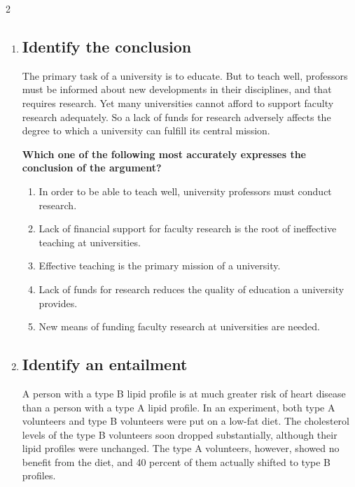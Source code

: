 \documentclass[9pt]{article}
\begin{document}
\begin{multicols}{2}
\small
\begin{enumerate}
\item
\subsection*{Identify the conclusion}

\noindent
The primary task of a university is to educate. But to teach well, professors must be informed about new developments in their disciplines, and that requires research. Yet many universities cannot afford to support faculty research adequately. So a lack of funds for research adversely affects the degree to which a university can fulfill its central mission.

 
\noindent

\textbf{Which one of the following most accurately expresses the conclusion of the argument?}

\begin{enumerate}[label=(\alph*)]
    \item In order to be able to teach well, university professors must conduct research.
    \item Lack of financial support for faculty research is the root of ineffective teaching at universities.
    \item Effective teaching is the primary mission of a university.
    \item Lack of funds for research reduces the quality of education a university provides.
    \item New means of funding faculty research at universities are needed.
\end{enumerate}

\item
\subsection*{Identify an entailment}
\noindent
A person with a type B lipid profile is at much greater risk of heart disease than a person with a type A lipid profile. In an experiment, both type A volunteers and type B volunteers were put on a low-fat diet. The cholesterol levels of the type B volunteers soon dropped substantially, although their lipid profiles were unchanged. The type A volunteers, however, showed no benefit from the diet, and 40 percent of them actually shifted to type B profiles.

 


\end{enumerate}
\end{multicols}
\end{document}
